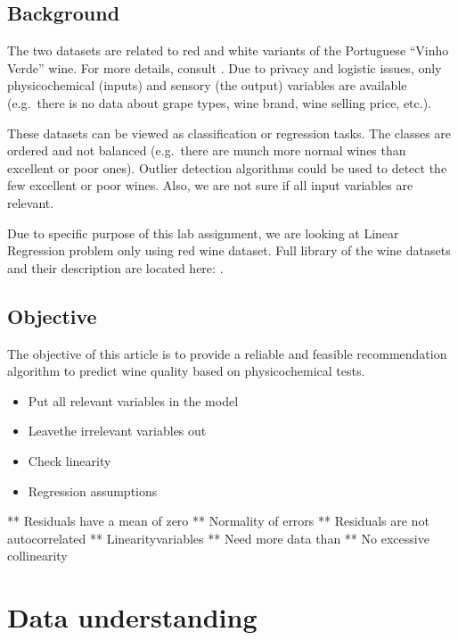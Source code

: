 \hypertarget{background}{%
\subsection{Background}\label{background}}

The two datasets are related to red and white variants of the Portuguese
``Vinho Verde'' wine. For more details, consult \citep{CorCer09}. Due to
privacy and logistic issues, only physicochemical (inputs) and sensory
(the output) variables are available (e.g.~there is no data about grape
types, wine brand, wine selling price, etc.).

These datasets can be viewed as classification or regression tasks. The
classes are ordered and not balanced (e.g.~there are munch more normal
wines than excellent or poor ones). Outlier detection algorithms could
be used to detect the few excellent or poor wines. Also, we are not sure
if all input variables are relevant.

Due to specific purpose of this lab assignment, we are looking at Linear
Regression problem only using red wine dataset. Full library of the wine
datasets and their description are located here: \citep{WineDataset}.

\hypertarget{objective}{%
\subsection{Objective}\label{objective}}

The objective of this article is to provide a reliable and feasible
recommendation algorithm to predict wine quality based on
physicochemical tests.

\begin{itemize}
\tightlist
\item
  Put all relevant variables in the model
\item
  Leavethe irrelevant variables out
\item
  Check linearity
\item
  Regression assumptions
\end{itemize}

** Residuals have a mean of zero ** Normality of errors ** Residuals are
not autocorrelated ** Linearityvariables ** Need more data than ** No
excessive collinearity

\hypertarget{data-understanding}{%
\section{Data understanding}\label{data-understanding}}

